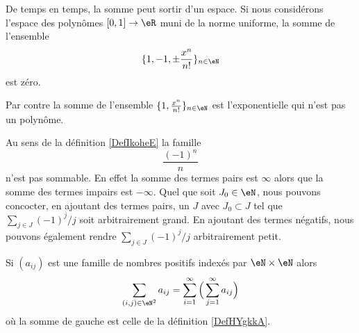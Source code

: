 \begin{example}
    De temps en temps, la somme peut sortir d'un espace. Si nous considérons l'espace des polynômes \( \mathopen[ 0 , 1 \mathclose]\to \eR\) muni de la norme uniforme, la somme de l'ensemble
    \begin{equation}
        \{ 1,-1,\pm\frac{ x^n }{ n! } \}_{n\in \eN}
    \end{equation}
    est zéro.

    Par contre la somme de l'ensemble \( \{ 1,\frac{ x^n }{ n! } \}_{n\in \eN}\) est l'exponentielle qui n'est pas un polynôme.
\end{example}

\begin{example}
    Au sens de la définition \ref{DefIkoheE} la famille
    \begin{equation}
        \frac{ (-1)^n }{ n }
    \end{equation}
    n'est pas sommable. En effet la somme des termes pairs est \( \infty\) alors que la somme des termes impairs est \( -\infty\). Quel que soit \( J_0\in \eN\), nous pouvons concocter, en ajoutant des termes pairs, un \( J\) avec \( J_0\subset J\) tel que \( \sum_{j\in J}(-1)^j/j\) soit arbitrairement grand. En ajoutant des termes négatifs, nous pouvons également rendre \( \sum_{j\in J}(-1)^j/j\) arbitrairement petit.
\end{example}

\begin{proposition} \label{PropVQCooYiWTs}
    Si \( (a_{ij})\) est une famille de nombres positifs indexés par \( \eN\times \eN\) alors
    \begin{equation}
        \sum_{(i,j)\in \eN^2}a_{ij}=\sum_{i=1}^{\infty}\Big( \sum_{j=1}^{\infty}a_{ij} \Big)
    \end{equation}
    où la somme de gauche est celle de la définition \ref{DefHYgkkA}.
\end{proposition}

